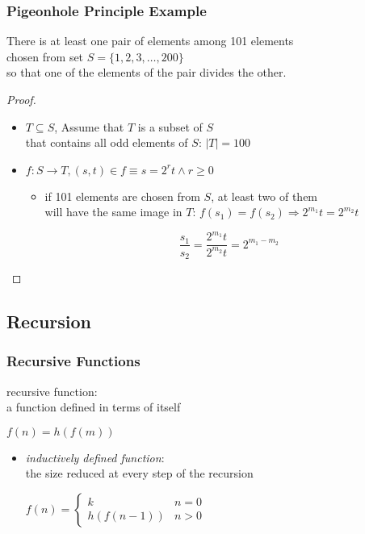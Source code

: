 \documentclass[dvipsnames]{beamer}
\begin{document}
\begin{frame}
  \frametitle{Pigeonhole Principle Example}

  \begin{theorem}
    There is at least one pair of elements among 101 elements\\
    chosen from set $S = \{1,2,3,\dots,200\}$\\
    so that one of the elements of the pair divides the other.
  \end{theorem}

  \pause
  \begin{proof}
    \begin{itemize}
      \item $T \subseteq S$, Assume that $T$ is a subset of $S$\\
        that contains all odd elements of $S$: $|T|=100$

      \pause
      \item $f: S \rightarrow T, (s, t) \in f \equiv s = 2^r t \wedge r \geq 0$
      \begin{itemize}
        \item if 101 elements are chosen from $S$, at least two of them\\
          will have the same image in $T$:
          $f(s_1)=f(s_2) \Rightarrow 2^{m_1} t = 2^{m_2} t$

        \pause
        \[
          \frac {s_1} {s_2} = \frac {2^{m_1} t} {2^{m_2} t} = 2^{m_1 - m_2}
        \]
      \end{itemize}
    \end{itemize}
  \end{proof}
\end{frame}

\subsection{Recursion}

\begin{frame}
  \frametitle{Recursive Functions}

  \begin{definition}
    \alert{recursive function}:\\
      a function defined in terms of itself

    \medskip
    $f(n) = h(f(m))$
  \end{definition}

  \begin{itemize}
    \item \emph{inductively defined function}:\\
      the size reduced at every step of the recursion

    \medskip
    $f(n) = \left\{
      \begin{array}{ll}
        k         & n = 0\\
        h(f(n-1)) & n > 0
      \end{array}
    \right.$
  \end{itemize}
\end{frame}
\end{document}
